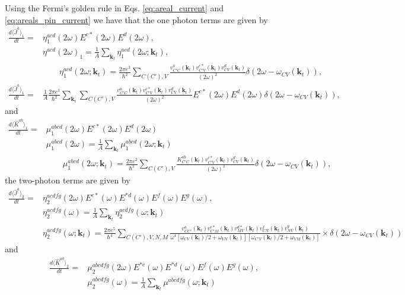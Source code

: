 \documentclass{article}
\begin{document}
Using the Fermi's golden rule in Eqs. \ref{eq:areal_current} and \ref{eq:areals_pin_current} we have that the one photon terms are given by
\begin{align*}
    \frac{d \langle \hat{J}^{a} \rangle_{1}}{dt} = & \eta_{1}^{acd}(2\omega) E^{c*}(2\omega) E^{d}(2\omega), \\
    & \eta^{acd}(2\omega)_{1} = \frac{1}{A} \sum_{\mathbf{k}_{t}} \eta_{1}^{acd}(2\omega;\mathbf{k}_{t}), \\
    & \qquad \eta_{1}^{acd}(2\omega;\mathbf{k}_{t}) = \frac{2\pi e^{3}}{\hbar^{2}} \sum_{C(C'),V}
    \frac{v^{a}_{C'C}(\mathbf{k}_{t})v^{c*}_{C'V}(\mathbf{k}_{t})v^{d}_{CV}(\mathbf{k}_{t})}{(2\omega)^{2}}
    \delta(2\omega-\omega_{CV}(\mathbf{k}_{t})), \\
    \frac{d \langle \hat{J}^{a} \rangle_{1}}{dt} = & \frac{1}{A}\frac{2\pi e^{3}}{\hbar^{2}} \sum_{\mathbf{k}_{t}} 
    \sum_{C(C'),V} \frac{v^{a}_{C'C}(\mathbf{k}_{t})v^{c*}_{C'V}(\mathbf{k}_{t})v^{d}_{CV}(\mathbf{k}_{t})}{(2\omega)^{2}}
    E^{c*}(2\omega) E^{d}(2\omega) \delta(2\omega-\omega_{CV}(\mathbf{k}_{t})),
\end{align*}
and
\begin{align*}
    \frac{d \langle \hat{K}^{ab}\rangle_{1}}{dt} = & \mu^{abcd}_{1}(2\omega)E^{c*}(2\omega)E^{d}(2\omega)\\
    & \mu^{abcd}_{1}(2\omega) = \frac{1}{A} \sum _{\mathbf{k}_{t}} \mu^{abcd}_{1}(2\omega;\mathbf{k}_{t}) \\
    & \qquad \mu^{abcd}_{1}(2\omega;\mathbf{k}_{t}) = \frac{2\pi e^{2}}{\hbar^{2}} \sum_{C(C'),V} \frac{K^{ab}_{C'C}(\mathbf{k}_{t}) v ^{c*}_{C'V}(\mathbf{k}_{t}) v^{d}_{CV}(\mathbf{k}_{t})}{(2\omega)^{2}} \delta(2\omega-\omega_{CV}(\mathbf{k}_{t})),
\end{align*}
the two-photon terms are given by 
\begin{align*}
    \frac{d \langle \hat{J}^{a} \rangle_{2}}{dt} = & \eta_{2}^{acdfg}(2\omega) E^{c*}(\omega) E^{*d}(\omega) E^{f}(\omega) E^{g}(\omega), \\
    & \eta_{2}^{acdfg}(\omega) = \frac{1}{A} \sum_{\mathbf{k}_{t}} \eta^{acdfg}_{2}(\omega;\mathbf{k}_{t})\\
    & \eta^{acdfg}_{2}(\omega;\mathbf{k}_{t}) = \frac{2\pi e^{5}}{\hbar^{4}} \sum_{C(C'),V,N,M} \frac{v^{a}_{CC'}(\mathbf{k}_{t}) v^{c*}_{C'M}(\mathbf{k}_{t}) v^{d*}_{MV}(\mathbf{k}_{t}) v^{f}_{CN}(\mathbf{k}_{t}) v^{g}_{NV}(\mathbf{k}_{t}) }{\omega^{4}[\omega_{CV}(\mathbf{k}_{t})/2 + \omega_{VN}(\mathbf{k}_{t})] [\omega_{C'V}(\mathbf{k}_{t})/2 + \omega_{VM}(\mathbf{k}_{t})] } \times\delta(2\omega-\omega_{CV}(\mathbf{k}_{t}))
\end{align*}
and
\begin{align*}
    \frac{d \langle \hat{K}^{ab} \rangle_{2}}{dt} = & \mu_{2}^{abcdfg}(2\omega) E^{*c}(\omega) E^{*d}(\omega) E^{f}(\omega) E^{g}(\omega), \\
    & \mu_{2}^{abcdfg}(\omega) = \frac{1}{A} \sum_{\mathbf{k}_{t}} \mu^{abcdfg}(\omega;\mathbf{k}_{t})
\end{align*}
\end{document}
